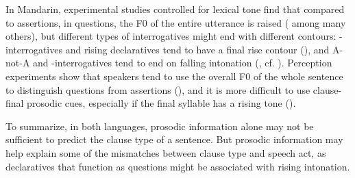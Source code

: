In Mandarin, experimental studies controlled for lexical tone find that compared to assertions, in questions, the F0 of the entire utterance is raised (\citealt{ho1977intonation, shen1991question, yuan2002prosody, nikawai2004, lee2005prosody, liuxu2005, yuan2006qprosody, yuan2011perception, liufang2009prosody, jiangchen2011} among many others), but different types of interrogatives might end with different contours: \ma-interrogatives and rising declaratives tend to have a final rise contour (\citealt{shen1991question, zeng2004tones}), and A-not-A and \twh-interrogatives tend to end on falling intonation (\citealt{shen1991question, nikawai2004}, cf. \citealt{liuxu2005,yang2020wh}). Perception experiments show that speakers tend to use the overall F0 of the whole sentence to distinguish questions from assertions (\citealt{jiangchen2011, gryllia2020typing}), and it is more difficult to use clause-final prosodic cues, especially if the final syllable has a rising tone (\citealt{yuan2011perception}). 

To summarize, in both languages, prosodic information alone may not be sufficient to predict the clause type of a sentence. But prosodic information may help explain some of the mismatches between clause type and speech act, as declaratives that function as questions might be associated with rising intonation.
	


